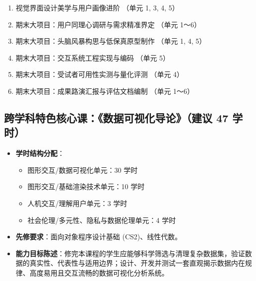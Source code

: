 \begin{itemize}
\begin{enumerate}
        \item[9.] 视觉界面设计美学与用户画像进阶 （单元 1, 3, 4, 5）
        \item[10.] 期末大项目：用户同理心调研与需求精准界定 （单元 1～6）
        \item[11.] 期末大项目：头脑风暴构思与低保真原型制作 （单元 1, 4, 5）
        \item[12--13.] 期末大项目：交互系统工程实现与编码 （单元 5）
        \item[14.] 期末大项目：受试者可用性实测与量化评测 （单元 4）
        \item[15.] 期末大项目：成果路演汇报与评估文档编制 （单元 1～6）
    \end{enumerate}
\end{itemize}

\subsection{跨学科特色核心课：《数据可视化导论》（建议 47 学时）}
\begin{itemize}
    \item \textbf{学时结构分配}：
    \begin{itemize}
        \item 图形交互/数据可视化单元：30 学时
        \item 图形交互/基础渲染技术单元：10 学时
        \item 人机交互/理解用户单元：3 学时
        \item 社会伦理/多元性、隐私与数据伦理单元：4 学时
    \end{itemize}
    \item \textbf{先修要求}：面向对象程序设计基础 (CS2)、线性代数。
    \item \textbf{能力目标陈述}：修完本课程的学生应能够科学筛选与清理复杂数据集，验证数据的真实性、代表性与适用边界；设计、开发并测试一套直观揭示数据内在规律、高度易用且交互流畅的数据可视化分析系统。
\end{itemize}

